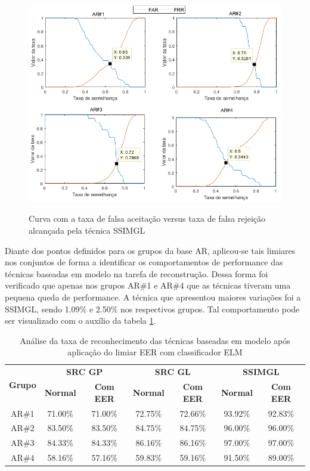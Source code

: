 \begin{figure}[H]
\centering
\caption{Curva com a taxa de falsa aceitação versus taxa de falsa rejeição alcançada pela técnica SSIMGL}
\includegraphics[scale=0.55	]{imgs4/graficos_FAR_FRR/ssimgl}
\label{fig:FAR_FRR_SSIMGL}
\end{figure}


Diante dos pontos definidos para os grupos da base AR, aplicou-se tais limiares nos conjuntos de forma a identificar os comportamentos de performance das técnicas baseadas em modelo na tarefa de reconstrução. Dessa forma foi verificado que apenas nos grupos AR\#1 e AR\#4 que as técnicas tiveram uma pequena queda de performance. A técnica que apresentou 	maiores variações foi a SSIMGL, sendo 1.09\% e 2.50\% nos respectivos grupos. Tal comportamento pode ser visualizado com o auxílio da tabela \ref{tab:eer_modelo}.  



\begin{table}[htpb]
    \centering
    \footnotesize
	\caption{Análise da taxa de reconhecimento das técnicas baseadas em modelo após aplicação do limiar EER com classificador ELM}
\begin{tabular}{|c|c|c|c|c|c|c|}
\hline
\multirow{2}{*}{\textbf{Grupo}}  & \multicolumn{2}{c|}{\textbf{SRC GP}} & \multicolumn{2}{c|}{\textbf{SRC GL}}  & \multicolumn{2}{c|}{\textbf{SSIMGL}}    \\\cline{2-7}
 & \textbf{Normal} & \textbf{Com EER}& \textbf{Normal} & \textbf{Com EER} & \textbf{Normal} & \textbf{Com EER}  \\\hline

AR\#1 &	71.00\%	& 71.00\%	&72.75\%	& 72.66\%	&93.92\%	&92.83\%  \\\hline
AR\#2 &	83.50\%	& 83.50\%	&84.75\%	& 84.75\%	&96.00\%	&96.00\%  \\\hline
AR\#3 &	84.33\%	& 84.33\%	&86.16\%	& 86.16\%	&97.00\%	&97.00\%  \\\hline
AR\#4 &	58.16\%	& 57.16\%	&59.83\%	& 59.16\%	&91.50\%	&89.00\%  \\\hline
 \end{tabular}
\label{tab:eer_modelo}
\end{table}





